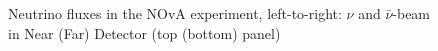 \begin{figure}[htb!]
\begin{center}
\caption{\label{NOvAspectra}Neutrino fluxes in the NOvA experiment, left-to-right: $\nu$ and $\bar\nu$-beam in Near (Far) Detector (top (bottom) panel)}
\end{center}
\end{figure}
